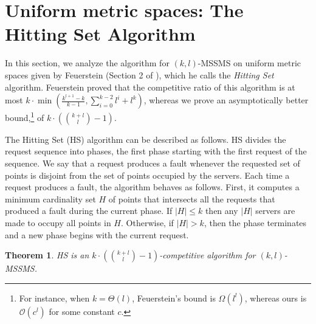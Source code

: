 \documentclass[11pt]{article}
\theoremstyle{plain}\newtheorem{theorem}{Theorem}
\theoremstyle{definition}
\theoremstyle{remark}
\begin{document}
\section{Uniform metric spaces: The Hitting Set Algorithm}\label{sec_hitting_set}

In this section, 
we analyze the algorithm for $(k,l)$-MSSMS on uniform metric spaces given by Feuerstein (Section 2 of \cite{Feuerstein98}), which he calls the \textit{Hitting Set} algorithm. Feuerstein proved that the competitive ratio of this algorithm is at most $k\cdot\min\left(\frac{k^{l+1}-k}{k-1},\sum_{i=0}^{k-2}l^i+l^k\right)$, whereas we prove an asymptotically better bound,\footnote{For instance, when $k=\Theta(l)$, Feuerstein's bound is $\Omega(l^l)$, whereas ours is $\mathcal{O}(c^l)$ for some constant $c$.} of $k\cdot\left({{k+l}\choose{l}}-1\right)$. 


The Hitting Set (HS) algorithm can be described as follows. HS divides the request sequence into phases, the first phase starting with the first request of the sequence. We say that a request produces a fault whenever the requested set of points is disjoint from the set of points occupied by the servers. 
Each time a request produces a fault, the algorithm behaves as follows. First, it computes a minimum cardinality set $H$ of points that intersects all the requests that produced a fault during the current phase. If $|H|\leq k$ then any $|H|$ servers are made to occupy all points in $H$. Otherwise, if $|H|>k$, then the phase terminates and a new phase begins with the current request.


\begin{theorem}
HS is an $k\cdot\left({{k+l}\choose{l}}-1\right)$-competitive algorithm for $(k,l)$-MSSMS.
\end{theorem}
\end{document}

